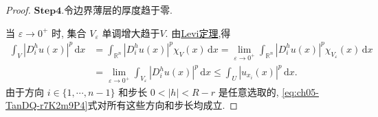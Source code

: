 \documentclass[../../main.tex]{subfiles}
\begin{document}
\begin{proof}
\noindent$\mathbf{Step}\bm{4}$.{\heiti 令边界薄层的厚度趋于零.}

当 $\varepsilon\to0^+$ 时, 集合 $V_\varepsilon$ 单调增大趋于$V$. 由\hyperref[Real Analysis-theorem:Beppo Levi非负渐升列积分定理]{Levi定理},得
\begin{align*}
\int_V{|D_{i}^{h}u(x)|^p\,\mathrm{d}x}&=\int_{\mathbb{R} ^n}{|D_{i}^{h}u(x)|^p\chi _V\left( x \right) \,\mathrm{d}x}=\lim_{\varepsilon \rightarrow 0^+} \int_{\mathbb{R} ^n}{|D_{i}^{h}u(x)|^p\chi _{V_{\varepsilon}}\left( x \right) \,\mathrm{d}x}
\\
&=\lim_{\varepsilon \rightarrow 0^+} \int_{V_{\varepsilon}}{|D_{i}^{h}u(x)|^p\,\mathrm{d}x}\leqslant \int_U{|u_{x_i}(x)|^p\,\mathrm{d}x}.
\end{align*}
由于方向 $i\in\{1,\cdots,n-1\}$ 和步长 $0<|h|<R-r$ 是任意选取的, \eqref{eq:ch05-TanDQ-r7K2m9P4}式对所有这些方向和步长均成立.
\end{proof}
\end{document}
